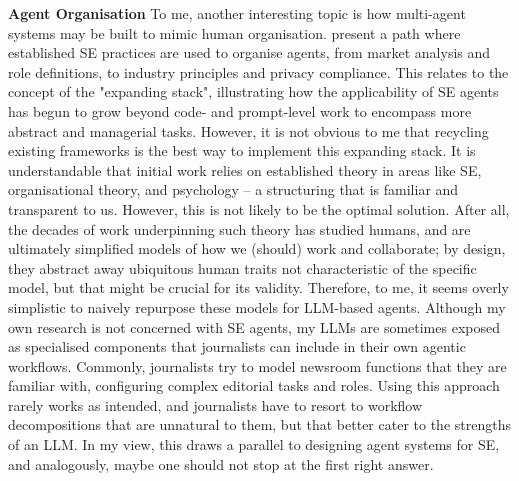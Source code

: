 \documentclass[11pt]{article}
\begin{document}
\textbf{Agent Organisation} To me, another interesting topic is how multi-agent systems may be built to mimic human organisation. \citet{heLLMBasedMultiAgentSystems2025} present a path where established SE practices are used to organise agents, from market analysis and role definitions, to industry principles and privacy compliance. This relates to the concept of the "expanding stack", illustrating how the applicability of SE agents has begun to grow beyond code- and prompt-level work to encompass more abstract and managerial tasks. However, it is not obvious to me that recycling existing frameworks is the best way to implement this expanding stack. It is understandable that initial work relies on established theory in areas like SE, organisational theory, and psychology – a structuring that is familiar and transparent to us. However, this is not likely to be the optimal solution. After all, the decades of work underpinning such theory has studied humans, and are ultimately simplified models of how we (should) work and collaborate; by design, they abstract away ubiquitous human traits not characteristic of the specific model, but that might be crucial for its validity. Therefore, to me, it seems overly simplistic to naively repurpose these models for LLM-based agents. Although my own research is not concerned with SE agents, my LLMs are sometimes exposed as specialised components that journalists can include in their own agentic workflows. Commonly, journalists try to model newsroom functions that they are familiar with, configuring complex editorial tasks and roles. Using this approach rarely works as intended, and journalists have to resort to workflow decompositions that are unnatural to them, but that better cater to the strengths of an LLM. In my view, this draws a parallel to designing agent systems for SE, and analogously, maybe one should not stop at the first right answer.
\end{document}
